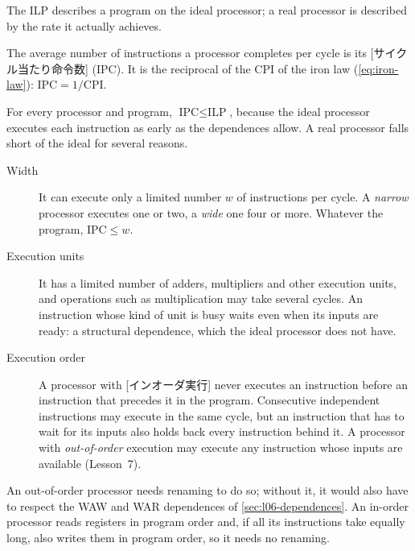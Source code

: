 \documentclass[../main.tex]{subfiles}
\begin{document}
The ILP describes a program on the ideal processor; a real processor is
described by the rate it actually achieves.

\begin{definition}
  \label{def:l06-ipc}
  The average number of instructions a processor completes per cycle is its
  [サイクル当たり命令数]%
   (IPC).  It is the reciprocal of
  the CPI of the iron law (\cref{eq:iron-law}): $\text{IPC} =
  1/\text{CPI}$.
\end{definition}

For every processor and program, $\text{IPC} \le \text{ILP}$, because the
ideal processor executes each instruction as early as the dependences allow.
A real processor falls short of the ideal for several reasons.
\begin{description}
  \item[Width] It can execute only a limited number $w$ of instructions per
    cycle.  A \emph{narrow} processor executes one or two, a \emph{wide} one
    four or more.  Whatever the program, $\text{IPC} \le w$.
  \item[Execution units] It has a limited number of adders, multipliers and
    other execution units, and operations such as multiplication may take
    several cycles.  An instruction whose kind of unit is busy waits even
    when its inputs are ready: a structural dependence, which the ideal
    processor does not have.
  \item[Execution order] A processor with [インオーダ実行] never executes an instruction before an
    instruction that precedes it in the program.  Consecutive independent
    instructions may execute in the same cycle, but an instruction that has
    to wait for its inputs also holds back every instruction behind it.  A
    processor with \emph{out-of-order}
    execution may execute any instruction whose inputs are available
    (Lesson~7).
\end{description}
An out-of-order processor needs renaming to do so; without it, it would
also have to respect the WAW and WAR dependences of
\cref{sec:l06-dependences}.  An in-order processor reads
registers in program order and, if all its instructions take equally long,
also writes them in program order, so it needs no renaming.
\end{document}
